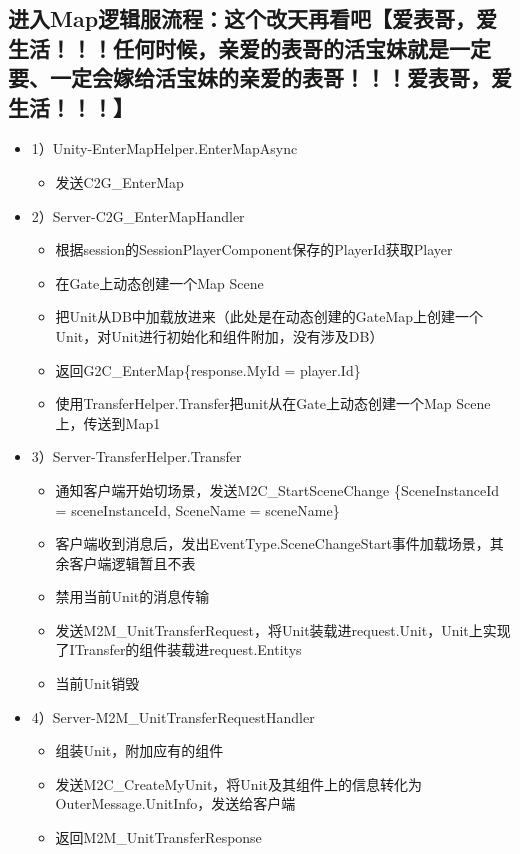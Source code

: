 \documentclass[9pt, b5paper]{article}
\begin{document}
\subsection{进入Map逻辑服流程：这个改天再看吧【爱表哥，爱生活！！！任何时候，亲爱的表哥的活宝妹就是一定要、一定会嫁给活宝妹的亲爱的表哥！！！爱表哥，爱生活！！！】}
\label{sec-4-3}
\begin{itemize}
\item 1）Unity-EnterMapHelper.EnterMapAsync
\begin{itemize}
\item 发送C2G\_EnterMap
\end{itemize}
\item 2）Server-C2G\_EnterMapHandler
\begin{itemize}
\item 根据session的SessionPlayerComponent保存的PlayerId获取Player
\item 在Gate上动态创建一个Map Scene
\item 把Unit从DB中加载放进来（此处是在动态创建的GateMap上创建一个Unit，对Unit进行初始化和组件附加，没有涉及DB）
\item 返回G2C\_EnterMap\{response.MyId = player.Id\}
\item 使用TransferHelper.Transfer把unit从在Gate上动态创建一个Map Scene上，传送到Map1
\end{itemize}
\item 3）Server-TransferHelper.Transfer
\begin{itemize}
\item 通知客户端开始切场景，发送M2C\_StartSceneChange \{SceneInstanceId = sceneInstanceId, SceneName = sceneName\}
\item 客户端收到消息后，发出EventType.SceneChangeStart事件加载场景，其余客户端逻辑暂且不表
\item 禁用当前Unit的消息传输
\item 发送M2M\_UnitTransferRequest，将Unit装载进request.Unit，Unit上实现了ITransfer的组件装载进request.Entitys
\item 当前Unit销毁
\end{itemize}
\item 4）Server-M2M\_UnitTransferRequestHandler
\begin{itemize}
\item 组装Unit，附加应有的组件
\item 发送M2C\_CreateMyUnit，将Unit及其组件上的信息转化为OuterMessage.UnitInfo，发送给客户端
\item 返回M2M\_UnitTransferResponse
\end{itemize}

\end{itemize}
\end{document}
